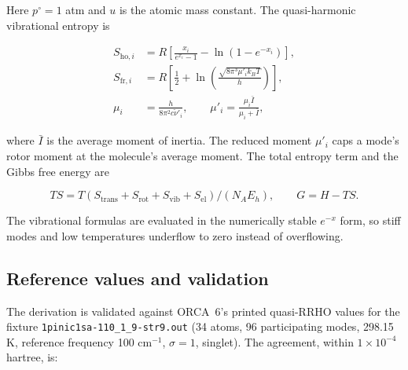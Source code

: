 Here $p^\circ = 1$ atm and $u$ is the atomic mass constant. The
quasi-harmonic vibrational entropy is

\begin{align}
S_{\mathrm{ho},i} &= R\left[
  \frac{x_i}{e^{x_i}-1} - \ln(1-e^{-x_i})\right],\\
S_{\mathrm{fr},i} &= R\left[
  \frac{1}{2} + \ln\!\left(\frac{\sqrt{8\pi^3 \mu'_i k_B T}}{h}\right)\right],\\
\mu_i &= \frac{h}{8\pi^2 c \tilde{\nu}'_i}, \qquad
\mu'_i = \frac{\mu_i \bar{I}}{\mu_i + \bar{I}},
\end{align}

where $\bar{I}$ is the average moment of inertia. The reduced moment
$\mu'_i$ caps a mode's rotor moment at the molecule's average moment. The
total entropy term and the Gibbs free energy are

\begin{equation}
T S = T\left(S_{\mathrm{trans}} + S_{\mathrm{rot}}
            + S_{\mathrm{vib}} + S_{\mathrm{el}}\right)/(N_A E_h),
\qquad
G = H - T S .
\end{equation}

The vibrational formulas are evaluated in the numerically stable
$e^{-x}$ form, so stiff modes and low temperatures underflow to zero instead
of overflowing.

\subsection{Reference values and validation}\label{sec:thermo-reference}

The derivation is validated against ORCA~6's printed quasi-RRHO values for
the fixture \texttt{1pinic1sa-110\_1\_9-str9.out} (34 atoms, 96 participating
modes, 298.15 K, reference frequency 100 cm$^{-1}$, $\sigma=1$, singlet).
The agreement, within $1\times 10^{-4}$ hartree, is:

